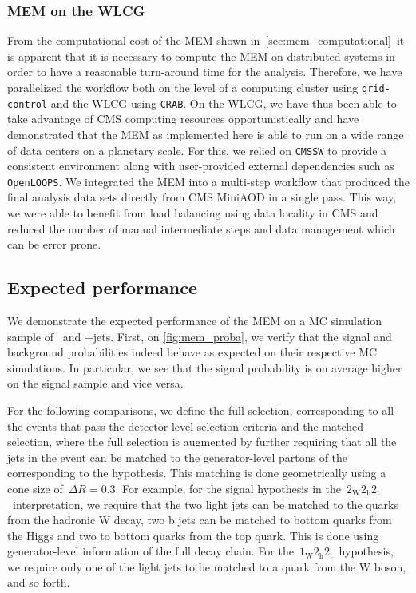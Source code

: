 \subsubsection{MEM on the WLCG}

From the computational cost of the MEM shown in~\cref{sec:mem_computational}~it is apparent that it is necessary to compute the MEM on distributed systems in order to have a reasonable turn-around time for the analysis. Therefore, we have parallelized the workflow both on the level of a computing cluster using \texttt{grid-control} and the WLCG using \texttt{CRAB}. On the WLCG, we have thus been able to take advantage of CMS computing resources opportunistically and have demonstrated that the MEM as implemented here is able to run on a wide range of data centers on a planetary scale. For this, we relied on \texttt{CMSSW} to provide a consistent environment along with user-provided external dependencies such as \texttt{OpenLOOPS}. We integrated the MEM into a multi-step workflow that produced the final analysis data sets directly from CMS MiniAOD in a single pass. This way, we were able to benefit from load balancing using data locality in CMS and reduced the number of manual intermediate steps and data management which can be error prone.

\subsection{Expected performance}
We demonstrate the expected performance of the MEM on a MC simulation sample of \ttH~and \ttbar+jets. First, on \cref{fig:mem_proba}, we verify that the signal and background probabilities indeed behave as expected on their respective MC simulations. In particular, we see that the signal probability is on average higher on the signal sample and vice versa.

For the following comparisons, we define the full selection, corresponding to all the events that pass the detector-level selection criteria and the matched selection, where the full selection is augmented by further requiring that all the jets in the event can be matched to the generator-level partons of the corresponding to the hypothesis. This matching is done geometrically using a cone size of~$\Delta R = 0.3$. For example, for the signal hypothesis in the~$2_{\mathrm{W}} 2_{\mathrm{h}} 2_{\mathrm{t}}$~interpretation, we require that the two light jets can be matched to the quarks from the hadronic W decay, two b jets can be matched to bottom quarks from the Higgs and two to bottom quarks from the top quark. This is done using generator-level information of the full decay chain. For the~$1_{\mathrm{W}} 2_{\mathrm{h}} 2_{\mathrm{t}}$~hypothesis, we require only one of the light jets to be matched to a quark from the W boson, and so forth.

